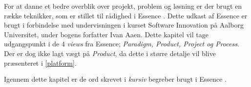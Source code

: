 For at danne et bedre overblik over projekt, problem og løsning er der brugt en række teknikker, som er stillet til rådighed i Essence \citep{art:essence}.
Dette udkast af Essence er brugt i forbindelse med undervisningen i kurset Software Innovation på Aalborg Universitet, under bogens forfatter Ivan Aaen.
Dette kapitel vil tage udgangspunkt i de 4 \textit{views} fra Essence; \textit{Paradigm, Product, Project og Process}.
Der er dog ikke lagt vægt på \textit{Product}, da dette i større detalje vil blive præsenteret i \cref{platform}.

Igennem dette kapitel er de ord skrevet i \textit{kursiv} begreber brugt i Essence \citep{art:essence}.
